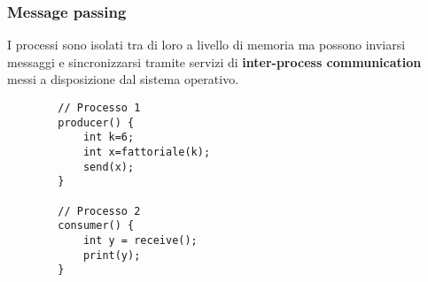\subsubsection{Message passing}
I processi sono isolati tra di loro a livello di memoria ma possono inviarsi messaggi e sincronizzarsi tramite servizi di \textbf{inter-process communication} messi a disposizione dal sistema operativo.
\begin{example}[IPC]
	\begin{lstlisting}
		// Processo 1
		producer() {
			int k=6;
			int x=fattoriale(k);
			send(x);
		}
		
		// Processo 2
		consumer() {
			int y = receive();
			print(y);
		}
	\end{lstlisting}
\end{example}